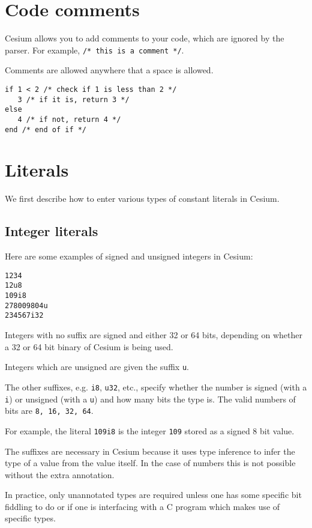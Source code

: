 \documentclass[a4paper,10pt]{article}
\newcommand{\code}{\lstinline}
\begin{document}
\section{Code comments}

Cesium allows you to add comments to your code, which are ignored by the parser. For example, 
\code{/* this is a comment */}.

Comments are allowed anywhere that a space is allowed.

\begin{lstlisting}
if 1 < 2 /* check if 1 is less than 2 */
   3 /* if it is, return 3 */
else
   4 /* if not, return 4 */
end /* end of if */
\end{lstlisting}

\section{Literals}

We first describe how to enter various types of constant literals in Cesium.  

\subsection{Integer literals}

Here are some examples of signed and unsigned integers in Cesium:

\begin{lstlisting}
1234
12u8
109i8
278009804u
234567i32
\end{lstlisting}

Integers with no suffix are signed and either 32 or 64 bits, depending on whether a 32 or 
64 bit binary of Cesium is being used.

Integers which are unsigned are given the suffix \code{u}. 

The other suffixes, e.g. \code{i8}, \code{u32}, etc., specify whether the number is signed
(with a \code{i}) or unsigned (with a \code{u}) and how many bits the type is. The valid 
numbers of bits are \code{8, 16, 32, 64}.

For example, the literal \code{109i8} is the integer \code{109} stored as a signed 8 bit 
value.

The suffixes are necessary in Cesium because it uses type inference to infer the type of a
value from the value itself. In the case of numbers this is not possible without the extra 
annotation. 

In practice, only unannotated types are required unless one has some specific bit fiddling 
to do or if one is interfacing with a C program which makes use of specific types.
\end{document}
